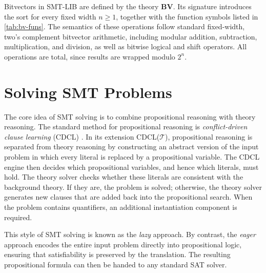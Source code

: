 Bitvectors in SMT-LIB are defined by the theory \textbf{BV}.
Its signature introduces the sort  for every fixed width $n \geq 1$, together with the function symbols listed in \cref{tab:bv-funs}.
The semantics of these operations follow standard fixed-width, two's complement bitvector arithmetic, including modular addition, subtraction, multiplication, and division, as well as bitwise logical and shift operators.
All operations are total, since results are wrapped modulo $2^n$.


\section{Solving SMT Problems}

The core idea of SMT solving is to combine propositional reasoning with theory reasoning.
The standard method for propositional reasoning is \emph{conflict-driven clause learning} (CDCL) \cite{dpll}.
In its extension CDCL($\mathcal{T}$), propositional reasoning is separated from theory reasoning by constructing an abstract version of the input problem in which every literal is replaced by a propositional variable.
The CDCL engine then decides which propositional variables, and hence which literals, must hold.
The theory solver checks whether these literals are consistent with the background theory.
If they are, the problem is solved; otherwise, the theory solver generates new clauses that are added back into the propositional search.
When the problem contains quantifiers, an additional instantiation component is required.

\begin{remark}
This style of SMT solving is known as the \emph{lazy} approach.
By contrast, the \emph{eager} approach encodes the entire input problem directly into propositional logic, ensuring that satisfiability is preserved by the translation.
The resulting propositional formula can then be handed to any standard SAT solver.
\end{remark}


